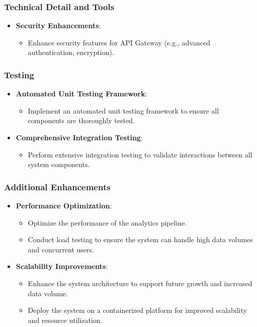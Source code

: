 \subsubsection{Technical Detail and Tools}
\begin{itemize}
    \item \textbf{Security Enhancements}:
        \begin{itemize}
            \item Enhance security features for API Gateway (e.g., advanced authentication, encryption).
        \end{itemize}
\end{itemize}

\subsubsection{Testing}
\begin{itemize}
    \item \textbf{Automated Unit Testing Framework}:
        \begin{itemize}
            \item Implement an automated unit testing framework to ensure all components are thoroughly tested.
        \end{itemize}
    \item \textbf{Comprehensive Integration Testing}:
        \begin{itemize}
            \item Perform extensive integration testing to validate interactions between all system components.
        \end{itemize}
\end{itemize}

\subsubsection{Additional Enhancements}
\begin{itemize}
    \item \textbf{Performance Optimization}:
        \begin{itemize}
            \item Optimize the performance of the analytics pipeline.
            \item Conduct load testing to ensure the system can handle high data volumes and concurrent users.
        \end{itemize}
    \item \textbf{Scalability Improvements}:
        \begin{itemize}
            \item Enhance the system architecture to support future growth and increased data volume.
            \item Deploy the system on a containerized platform for improved scalability and resource utilization.
        \end{itemize}
\end{itemize}

